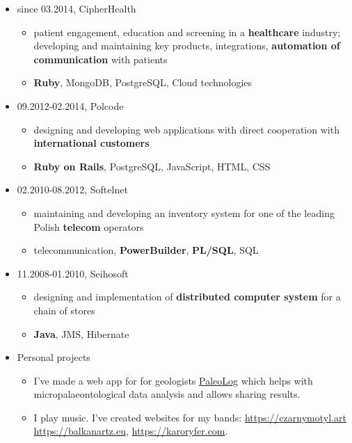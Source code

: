 \documentclass[a4paper]{article}
\begin{document}
\begin{itemize}
  \item
  since 03.2014,
  CipherHealth
  \begin{itemize}
    \item
      patient engagement, education and screening in a \textbf{healthcare} industry; developing and maintaining key products, integrations, \textbf{automation of communication} with patients
    \item
      \textbf{Ruby}, MongoDB, PostgreSQL, Cloud technologies
  \end{itemize}
  \item
    09.2012-02.2014,
    Polcode
    \begin{itemize}
      \item
        designing and developing web applications with direct cooperation with \textbf{international customers}
      \item
        \textbf{Ruby on Rails}, PostgreSQL, JavaScript, HTML, CSS
    \end{itemize}
  \item
    02.2010-08.2012,
    Softelnet
    \begin{itemize}
      \item
        maintaining and developing an inventory system
        for one of the leading Polish \textbf{telecom} operators
      \item
        telecommunication, \textbf{PowerBuilder}, \textbf{PL/SQL}, SQL
    \end{itemize}
  \item
    11.2008-01.2010,
    Seihosoft
    \begin{itemize}
      \item
        designing and implementation of \textbf{distributed computer system}
        for a chain of stores
      \item
        \textbf{Java}, JMS, Hibernate
    \end{itemize}
  \item
    Personal projects
    \begin{itemize}
      \item
        I've made a web app for for geologists \href{https://github.com/mradmacher/paleolog}{PaleoLog} which helps with micropalaeontological data analysis and allows sharing results.
      \item
        I play music. I've created websites for my bands: \href{https://czarnymotyl.art}{https://czarnymotyl.art} \href{https://balkanartz.eu}{https://balkanartz.eu}, \href{https://karoryfer.com}{https://karoryfer.com}.
    \end{itemize}
\end{itemize}
\end{document}
